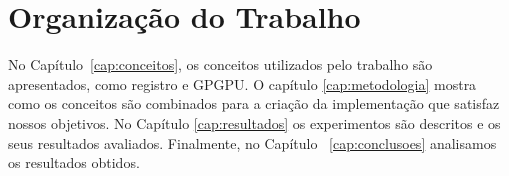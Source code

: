 \section{Organização do Trabalho}
\label{sec:organizacao_trabalho}

No Capítulo~\ref{cap:conceitos}, os conceitos utilizados pelo trabalho
são apresentados, como registro e GPGPU. O capítulo \ref{cap:metodologia}
mostra como os conceitos são combinados para a criação da implementação que
satisfaz nossos objetivos. No Capítulo \ref{cap:resultados} os experimentos são
descritos e os seus resultados avaliados. Finalmente, no Capítulo
~\ref{cap:conclusoes} analisamos os resultados obtidos.
